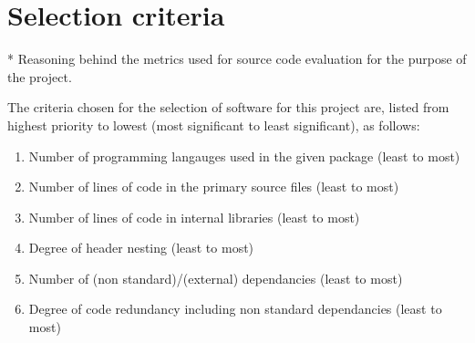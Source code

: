 \section{Selection criteria}\label{Selection criteria}

* Reasoning behind the metrics used for source code evaluation for the purpose of the project.

The criteria chosen for the selection of software for this project are, listed from highest priority to lowest (most significant to least significant), as follows:

\begin{enumerate}
    \item Number of programming langauges used in the given package (least to most)
    \item Number of lines of code in the primary source files (least to most)
    \item Number of lines of code in internal libraries (least to most)
    \item Degree of header nesting (least to most)
    \item Number of (non standard)/(external) dependancies (least to most)
    \item Degree of code redundancy including non standard dependancies (least to most)
\end{enumerate}
